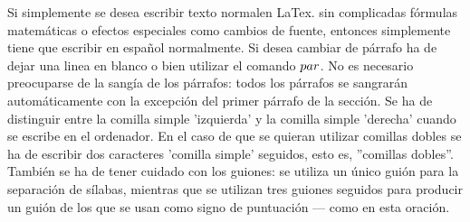 \documentclass[a4paper,10pt]{letter}
\begin{document}
Si simplemente se desea escribir texto normalen LaTex.
sin complicadas fórmulas matemáticas o efectos especiales
como cambios de fuente, entonces simplemente tiene que escribir
en español normalmente.
Si desea cambiar de párrafo ha de dejar una linea en blanco o bien
utilizar el comando $\\par$.
No es necesario preocuparse de la sangía de los párrafos:
todos los párrafos se sangrarán automáticamente con la excepción 
del primer párrafo de la sección.
Se ha de distinguir entre la comilla simple 'izquierda'
y la comilla simple 'derecha' cuando se escribe en el ordenador.
En el caso de que se quieran utilizar comillas dobles se ha de
escribir dos caracteres 'comilla simple' seguidos, esto es,
''comillas dobles''.
También se ha de tener cuidado con los guiones: se utiliza un único
guión para la separación de sílabas, mientras que se utilizan
tres guiones seguidos para producir un guión de los que se usan
como signo de puntuación --- como en esta oración.
\end{document}
